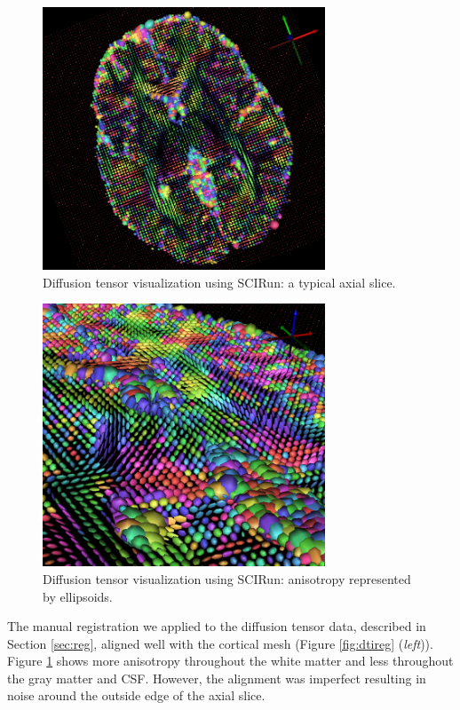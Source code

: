 \begin{figure}[H]
\begin{center}
\includegraphics[width=0.75\textwidth]{Figures/DTI_1.png}
\caption{Diffusion tensor visualization using SCIRun: a typical axial slice.}
\label{fig:tensorvis}
\end{center}
\end{figure}

\begin{figure}[H]
\begin{center}
\includegraphics[width=0.75\textwidth]{Figures/DTI_2.png}
\caption{Diffusion tensor visualization using SCIRun: anisotropy represented by ellipsoids.}
\label{fig:tensorvis2}
\end{center}
\end{figure}

The manual registration we applied to the diffusion tensor data, described in Section \ref{sec:reg}, aligned well with the cortical mesh (Figure \ref{fig:dtireg} (\textit{left})). Figure \ref{fig:tensorvis} shows more anisotropy throughout the white matter and less throughout the gray matter and CSF. However,  the alignment was imperfect resulting in noise around the outside edge of the axial slice.  
 
